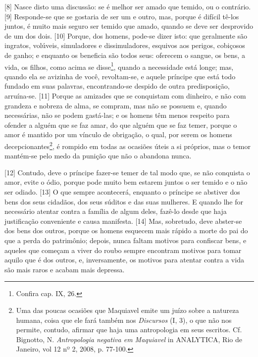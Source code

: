 {[}8{]} Nasce disto uma discussão: se é melhor ser amado que temido, ou
o contrário. {[}9{]} Responde-se que se gostaria de ser um e outro, mas,
porque é difícil tê-los juntos, é muito mais seguro ser temido que
amado, quando se deve ser desprovido de um dos dois. {[}10{]} Porque,
dos homens, pode-se dizer isto: que geralmente são ingratos, volúveis,
simuladores e dissimuladores, esquivos aos perigos, cobiçosos de ganho;
e enquanto os beneficia são todos seus: oferecem o sangue, os bens, a
vida, os filhos, como acima se disse\footnote{Confira cap. IX, 26.},
quando a necessidade está longe; mas, quando ela se avizinha de você,
revoltam-se, e aquele príncipe que está todo fundado em suas palavras,
encontrando-se despido de outra predisposição, arruína-se. {[}11{]}
Porque as amizades que se conquistam com dinheiro, e não com grandeza e
nobreza de alma, se compram, mas não se possuem e, quando necessárias,
não se podem gastá-las; e os homens têm menos respeito para ofender a
alguém que se faz amar, do que alguém que se faz temer, porque o amor é
mantido por um vínculo de obrigação, o qual, por serem os homens
decepcionantes\footnote{Uma das poucas ocasiões que Maquiavel emite um
  juízo sobre a natureza humana, coisa que ele fará também nos
  \emph{Discursos} (I, 3), o que não nos permite, contudo, afirmar que
  haja uma antropologia em seus escritos. Cf. Bignotto, N.
  \emph{Antropologia negativa em Maquiavel} in ANALYTICA, Rio de
  Janeiro, vol 12 nº 2, 2008, p. 77-100.}, é rompido em todas as
ocasiões úteis a si próprios, mas o temor mantém-se pelo medo da punição
que não o abandona nunca.

{[}12{]} Contudo, deve o príncipe fazer-se temer de tal modo que, se não
conquista o amor, evite o ódio, porque pode muito bem estarem juntos o
ser temido e o não ser odiado. {[}13{]} O que sempre acontecerá,
enquanto o príncipe se abstiver dos bens dos seus cidadãos, dos seus
súditos e das suas mulheres. E quando lhe for necessário atentar contra
a família de algum deles, fazê-lo desde que haja justificação
conveniente e causa manifesta. {[}14{]} Mas, sobretudo, deve abster-se
dos bens dos outros, porque os homens esquecem mais rápido a morte do
pai do que a perda do patrimônio; depois, nunca faltam motivos para
confiscar bens, e aqueles que começam a viver do roubo sempre encontram
motivos para tomar aquilo que é dos outros, e, inversamente, os motivos
para atentar contra a vida são mais raros e acabam mais depressa.

